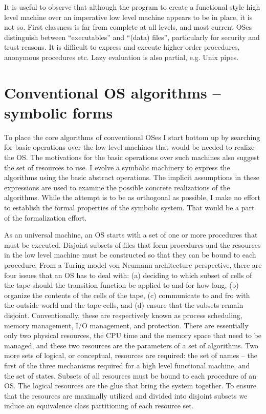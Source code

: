 \documentclass[draft]{article}
\begin{document}
It  is  useful  to observe  that  although  the  program to  create  a
functional  style high  level  machine over  an  imperative low  level
machine appears to be in place,  it is not so.  First classness is far
from complete at all levels, and most current OSes distinguish between
``executables''  and ``(data) files'',  particularly for  security and
trust reasons.   It is difficult  to express and execute  higher order
procedures,  anonymous  procedures   etc.   Lazy  evaluation  is  also
partial, e.g. Unix pipes.

\section{Conventional OS algorithms -- symbolic forms}
\label{sec:algorithms}
\label{sec:conventional:os:algorithms}

To place the core algorithms of conventional OSes I start bottom up by
searching for basic operations over  the low level machines that would
be needed to realize the OS.  The motivations for the basic operations
over such machines also suggest the set of resources to use.  I evolve
a  symbolic  machinery  to  express  the algorithms  using  the  basic
abstract  operations.  The implicit  assumptions in  these expressions
are  used  to  examine  the  possible  concrete  realizations  of  the
algorithms.  While the  attempt is to be as  orthogonal as possible, I
make  no effort  to establish  the formal  properties of  the symbolic
system.  That would be a part of the formalization effort.

As  an universal  machine, an  OS starts  with a  set of  one  or more
procedures that must be executed.  Disjoint subsets of files that form
procedures  and  the  resources  in  the low  level  machine  must  be
constructed  so that  they can  be bound  to each  procedure.   From a
Turing  model von  Neumann  architecture perspective,  there are  four
issues that  an OS has to deal  with: (a) deciding to  which subset of
cells of the tape should the transition function be applied to and for
how long,  (b) organize  the contents  of the cells  of the  tape, (c)
communicate to and fro with the  outside world and the tape cells, and
(d) ensure  that the  subsets remain disjoint.   Conventionally, these
are respectively  known as process scheduling,  memory management, I/O
management, and  protection.  There are essentially  only two physical
resources, the CPU time and the  memory space that need to be managed,
and these  two resources  are the parameters  of a set  of algorithms.
Two more sets  of logical, or conceptual, resources  are required: the
set of names -- the first  of the three mechanisms required for a high
level  functional machine,  and the  set  of states.   Subsets of  all
resources  must be  bound to  each procedure  of an  OS.   The logical
resources are the glue that bring the system together.  To ensure that
the resources are maximally utilized and divided into disjoint subsets
we induce an equivalence class partitioning of each resource set.
\end{document}

